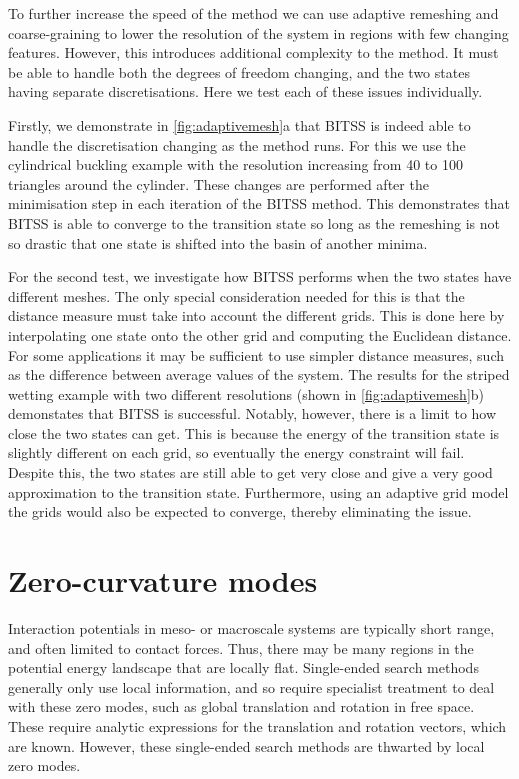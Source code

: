 \documentclass[aps,twocolumn]{revtex4}
\begin{document}
\topic To further increase the speed of the method we can use adaptive remeshing and coarse-graining to lower the resolution of the system in regions with few changing features.
However, this introduces additional complexity to the method.
It must be able to handle both the degrees of freedom changing, and the two states having separate discretisations.
Here we test each of these issues individually.

\topic Firstly, we demonstrate in \cref{fig:adaptivemesh}a that BITSS is indeed able to handle the discretisation changing as the method runs.
For this we use the cylindrical buckling example with the resolution increasing from 40 to 100 triangles around the cylinder.
These changes are performed after the minimisation step in each iteration of the BITSS method.
This demonstrates that BITSS is able to converge to the transition state so long as the remeshing is not so drastic that one state is shifted into the basin of another minima.

\topic For the second test, we investigate how BITSS performs when the two states have different meshes.
The only special consideration needed for this is that the distance measure must take into account the different grids.
This is done here by interpolating one state onto the other grid and computing the Euclidean distance.
For some applications it may be sufficient to use simpler distance measures, such as the difference between average values of the system.
The results for the striped wetting example with two different resolutions (shown in \cref{fig:adaptivemesh}b) demonstates that BITSS is successful.
Notably, however, there is a limit to how close the two states can get.
This is because the energy of the transition state is slightly different on each grid, so eventually the energy constraint will fail.
Despite this, the two states are still able to get very close and give a very good approximation to the transition state.
Furthermore, using an adaptive grid model the grids would also be expected to converge, thereby eliminating the issue.


\section{Zero-curvature modes}
\topic Interaction potentials in meso- or macroscale systems are typically short range, and often limited to contact forces.
Thus, there may be many regions in the potential energy landscape that are locally flat.
Single-ended search methods generally only use local information, and so require specialist treatment to deal with these zero modes, such as global translation and rotation in free space.
These require analytic expressions for the translation and rotation vectors, which are known.
However, these single-ended search methods are thwarted by local zero modes.
\end{document}
